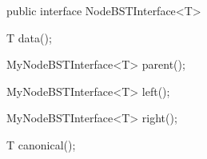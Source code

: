 public interface NodeBSTInterface<T> {

	T data();

	MyNodeBSTInterface<T> parent();

	MyNodeBSTInterface<T> left();

	MyNodeBSTInterface<T> right();

	T canonical();

}